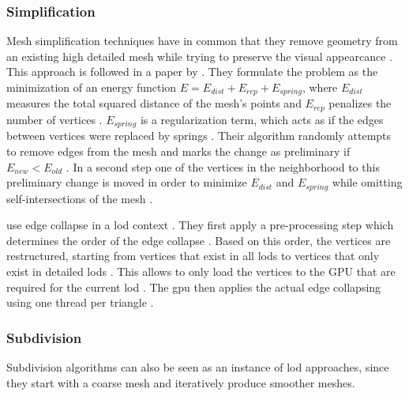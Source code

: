\subsubsection*{Simplification}
Mesh simplification techniques have in common that they remove geometry from an existing high detailed mesh while trying to preserve the visual appearcance \cite{realtime}.
This approach is followed in a paper by \citeauthor{hoppe_simplification} \cite{hoppe_simplification}.
They formulate the problem as the minimization of an energy function $E = E_{dist} + E_{rep} + E_{spring}$, where $E_{dist}$ measures the total squared distance of the mesh's points and $E_{rep}$ penalizes the number of vertices \cite{hoppe_simplification}.
$E_{spring}$ is a regularization term, which acts as if the edges between vertices were replaced by springs \cite{hoppe_simplification}.
Their algorithm randomly attempts to remove edges from the mesh and marks the change as preliminary if $E_{new} < E_{old}$ \cite{hoppe_simplification}.
In a second step one of the vertices in the neighborhood to this preliminary change is moved in order to minimize $E_{dist}$ and $E_{spring}$ while omitting self-intersections of the mesh \cite{hoppe_simplification}.

\citeauthor{peng_simplification} use edge collapse in a \ac{lod} context \cite{peng_simplification}.
They first apply a pre-processing step which determines the order of the edge collapse \cite{peng_simplification}.
Based on this order, the vertices are restructured, starting from vertices that exist in all \acp{lod} to vertices that only exist in detailed \acp{lod} \cite{peng_simplification}.
This allows to only load the vertices to the GPU that are required for the current \ac{lod} \cite{peng_simplification}.
The \ac{gpu} then applies the actual edge collapsing using one thread per triangle \cite{peng_simplification}.

\subsubsection*{Subdivision}
Subdivision algorithms can also be seen as an instance of \ac{lod} approaches, since they start with a coarse mesh and iteratively produce smoother meshes.


